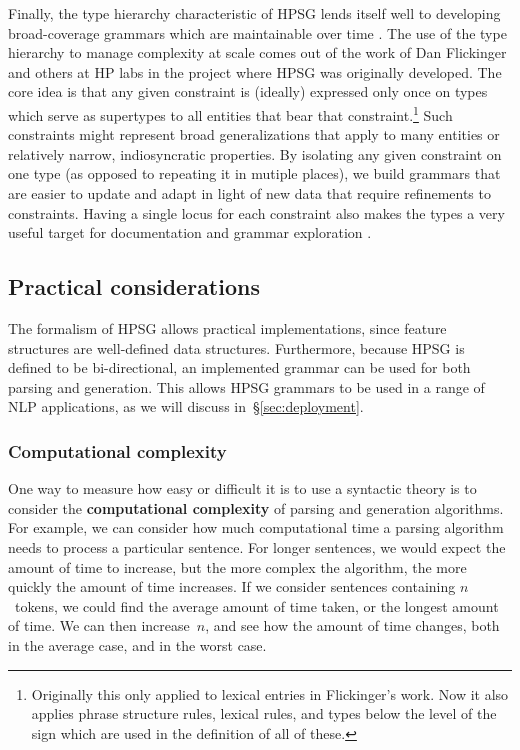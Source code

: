 \documentclass[output=paper]{langsci/langscibook}
\begin{document}
Finally, the type hierarchy characteristic of HPSG lends itself well to developing broad-coverage grammars which are maintainable over time \cite{FIXME-find-cite?}. The use of the type hierarchy to manage complexity at scale comes out of the work of Dan Flickinger \cite{Flickinger87} and others at HP labs in the project where HPSG was originally developed. The core idea is that any given constraint is (ideally) expressed only once on types which serve as supertypes to all entities that bear that constraint.\footnote{Originally this only applied to lexical entries in Flickinger's work. Now it also applies phrase structure rules, lexical rules, and types below the level of the sign which are used in the definition of all of these.} Such constraints might represent broad generalizations that apply to many entities or relatively narrow, indiosyncratic properties. By isolating any given constraint on one type (as opposed to repeating it in mutiple places), we build grammars that are easier to update and adapt in light of new data that require refinements to constraints. Having a single locus for each constraint also makes the types a very useful target for documentation \cite{FIXME:LTDB} and grammar exploration \cite{FIXME:typediff}. 


\subsection{Practical considerations}
\label{sec:practical}

The formalism of HPSG allows practical implementations,
since feature structures are well-defined data structures.
Furthermore, because HPSG is defined to be bi-directional,
an implemented grammar can be used for both parsing and generation.
This allows HPSG grammars to be used in a range of NLP applications,
as we will discuss in~\S\ref{sec:deployment}.

\subsubsection{Computational complexity}

One way to measure how easy or difficult it is to use a syntactic theory
is to consider the \textbf{computational complexity} of parsing and generation algorithms.
For example, we can consider how much computational time
a parsing algorithm needs to process a particular sentence.
For longer sentences, we would expect the amount of time to increase,
but the more complex the algorithm,
the more quickly the amount of time increases.
If we consider sentences containing $n$~tokens,
we could find the average amount of time taken,
or the longest amount of time.
We can then increase~$n$, and see how the amount of time changes,
both in the average case, and in the worst case.
\end{document}
